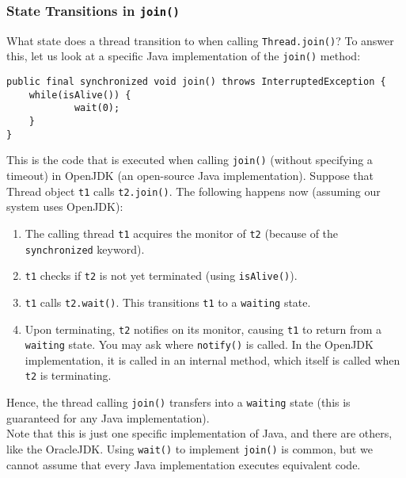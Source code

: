 \documentclass[main.tex]{subfiles}
\begin{document}
\subsubsection{State Transitions in \texttt{join()}}
What state does a thread transition to when calling \texttt{Thread.join()}? To answer this, let us look at a specific Java implementation of the \texttt{join()} method:
\begin{verbatim}
public final synchronized void join() throws InterruptedException {
    while(isAlive()) {
            wait(0);
    }
}
\end{verbatim}
This is the code that is executed when calling \texttt{join()} (without specifying a timeout) in OpenJDK (an open-source Java implementation). Suppose that Thread object \texttt{t1} calls \texttt{t2.join()}. The following happens now (assuming our system uses OpenJDK):
\begin{enumerate}
  \item The calling thread \texttt{t1} acquires the monitor of \texttt{t2} (because of the \texttt{synchronized} keyword).
  \item \texttt{t1} checks if \texttt{t2} is not yet terminated (using \texttt{isAlive()}).
  \item \texttt{t1} calls \texttt{t2.wait()}. This transitions \texttt{t1} to a \texttt{waiting} state.
  \item Upon terminating, \texttt{t2} notifies on its monitor, causing \texttt{t1} to return from a \texttt{waiting} state. You may ask where \texttt{notify()} is called. In the OpenJDK implementation, it is called in an internal method, which itself is called when \texttt{t2} is terminating.
\end{enumerate}
Hence, the thread calling \texttt{join()} transfers into a \texttt{waiting} state (this is guaranteed for any Java implementation).\\
Note that this is just one specific implementation of Java, and there are others, like the OracleJDK. Using \texttt{wait()} to implement \texttt{join()} is common, but we cannot assume that every Java implementation executes equivalent code.

\end{document}
